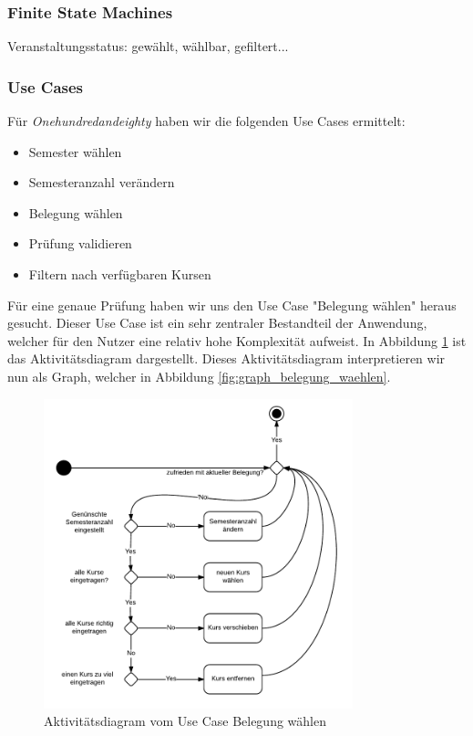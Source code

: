 \documentclass[ngerman]{article}
\begin{document}
\subsubsection{Finite State Machines}
Veranstaltungsstatus: gewählt, wählbar, gefiltert...


\subsubsection{Use Cases}
Für \emph{Onehundredandeighty} haben wir die folgenden Use Cases ermittelt:

\begin{itemize}
    \item Semester wählen
    \item Semesteranzahl verändern
    \item Belegung wählen
    \item Prüfung validieren
    \item Filtern nach verfügbaren Kursen
\end{itemize}

Für eine genaue Prüfung haben wir uns den Use Case "Belegung wählen" heraus gesucht. Dieser Use Case ist ein sehr zentraler Bestandteil der Anwendung, welcher für den Nutzer eine relativ hohe Komplexität aufweist. In Abbildung \ref{fig:aktivity_belegung_waehlen} ist das Aktivitätsdiagram dargestellt. Dieses Aktivitätsdiagram interpretieren wir nun als Graph, welcher in Abbildung \ref{fig:graph_belegung_waehlen}.

\begin{figure}[h!]
\includegraphics[width=0.8\textwidth]{figures/180_Belegungaendern_aktivitaet.pdf}
\caption{Aktivitätsdiagram vom Use Case Belegung wählen}
\label{fig:aktivity_belegung_waehlen}
\end{figure}
\end{document}
